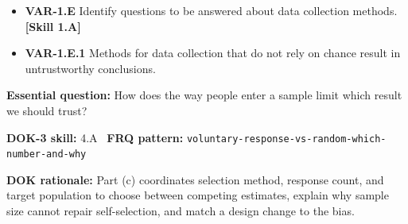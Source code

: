 \documentclass[11pt]{article}
\begin{document}


{\small
\begin{itemize}[leftmargin=1.5em,itemsep=2pt,topsep=2pt]
  \item \textbf{VAR-1.E} Identify questions to be answered about data collection methods. \textbf{[Skill 1.A]}
  \item \textbf{VAR-1.E.1} Methods for data collection that do not rely on chance result in untrustworthy conclusions.
\end{itemize}
}
\textbf{Essential question:} How does the way people enter a sample limit which result we should trust?\par
\textbf{DOK-3 skill:} 4.A \textperiodcentered\ \textbf{FRQ pattern:} {\small\texttt{voluntary-\allowbreak{}response-\allowbreak{}vs-\allowbreak{}random-\allowbreak{}which-\allowbreak{}number-\allowbreak{}and-\allowbreak{}why}}\par
\textbf{DOK rationale:} Part (c) coordinates selection method, response count, and target population to choose between competing estimates, explain why sample size cannot repair self-selection, and match a design change to the bias.\par
\end{document}
